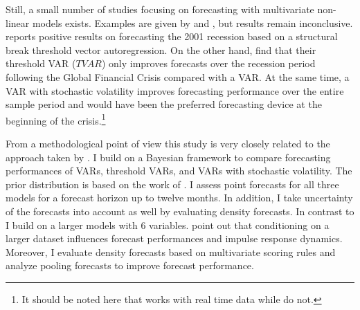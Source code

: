 \documentclass[12pt,letterpaper,fleqn]{article}           %
\begin{document}
Still, a small number of studies focusing on forecasting with multivariate non-linear models exists. Examples are given by \textcite{alessandri17} and \textcite{galvao06}, but results remain inconclusive. \textcite{galvao06} reports positive results on forecasting the 2001 recession based on a structural break threshold vector autoregression. On the other hand, \textcite{alessandri17} find that their threshold VAR ($TVAR$) only improves forecasts over the recession period following the Global Financial Crisis compared with a VAR. At the same time, a VAR with stochastic volatility improves forecasting performance over the entire sample period and would have been the preferred forecasting device at the beginning of the crisis.\footnote{It should be noted here that \textcite{galvao06} works with real time data while \textcite{alessandri17} do not.}


From a methodological point of view this study is very closely related to the approach taken by \textcite{alessandri17}. I build on a Bayesian framework to compare forecasting performances of VARs, threshold VARs, and VARs with stochastic volatility. The prior distribution is based on the work of \textcite{banbura10}. I assess point forecasts for all three models for a forecast horizon up to twelve months. In addition, I take uncertainty of the forecasts into account as well by evaluating density forecasts.
In contrast to \textcite{alessandri17} I build on a larger models with 6 variables. \textcite{banbura10} point out that conditioning on a larger dataset influences forecast performances and impulse response dynamics. Moreover, I evaluate density forecasts based on multivariate scoring rules and analyze pooling forecasts to improve forecast performance.
\end{document}
